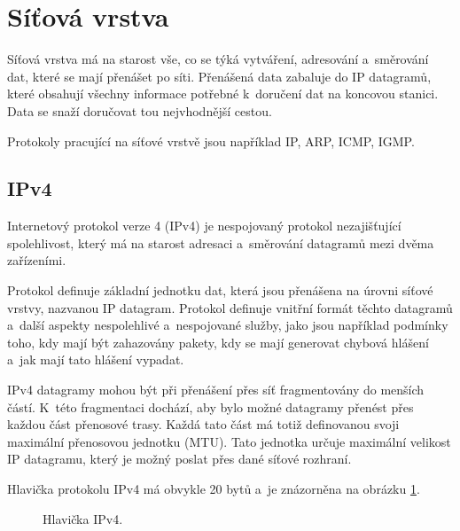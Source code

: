 \section{Síťová vrstva}
Síťová vrstva má na starost vše, co se týká vytváření, adresování a~směrování dat, které se mají přenášet po síti. Přenášená data zabaluje do IP datagramů, které obsahují všechny informace potřebné k~doručení dat na koncovou stanici. Data se snaží doručovat tou nejvhodnější cestou.

Protokoly pracující na síťové vrstvě jsou například IP, ARP, ICMP, IGMP.

\subsection{IPv4}
Internetový protokol verze 4 (IPv4) \cite{ipv4} je nespojovaný protokol nezajišťující spolehlivost, který má na starost adresaci a~směrování datagramů mezi dvěma zařízeními.

Protokol definuje základní jednotku dat, která jsou přenášena na úrovni síťové vrstvy, nazvanou IP datagram. Protokol definuje vnitřní formát těchto datagramů a~další aspekty nespolehlivé a~nespojované služby, jako jsou například podmínky toho, kdy mají být zahazovány pakety, kdy se mají generovat chybová hlášení a~jak mají tato hlášení vypadat.

IPv4 datagramy mohou být při přenášení přes síť fragmentovány do menších částí. K~této fragmentaci dochází, aby bylo možné datagramy přenést přes každou část přenosové trasy. Každá tato část má totiž definovanou svoji maximální přenosovou jednotku (MTU). Tato jednotka určuje maximální velikost IP datagramu, který je možný poslat přes dané síťové rozhraní. 

Hlavička protokolu IPv4 má obvykle 20 bytů a~je znázorněna na obrázku \ref{img:hlavika_ipv4}.

\begin{figure}[H]
    \centering
    \caption{Hlavička IPv4.}
    \label{img:hlavika_ipv4}
\end{figure}

